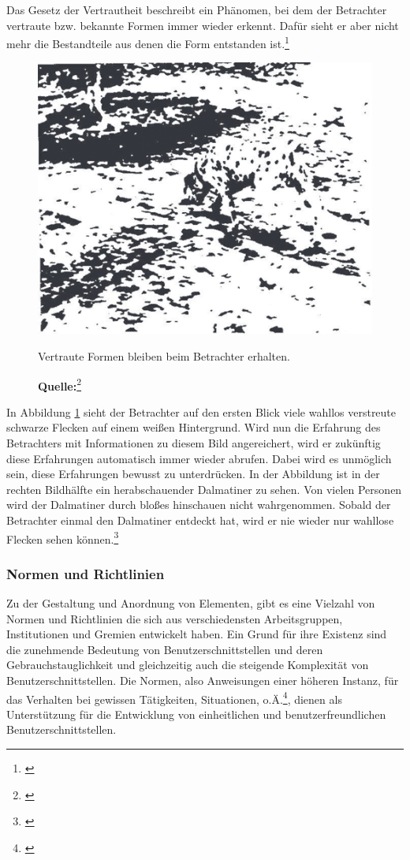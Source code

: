 Das Gesetz der Vertrautheit beschreibt ein Phänomen, bei dem der Betrachter vertraute bzw. bekannte Formen immer wieder erkennt. Dafür sieht er aber nicht mehr die Bestandteile aus denen die Form entstanden ist.\footnote{\cite[vgl.][63f]{Dahm2006}}
\begin{figure}[H]
  \centering
  \includegraphics[scale=0.7]{img/gesetz_der_Vertrautheit.PNG}
  \caption{Vertraute Formen bleiben beim Betrachter erhalten.}
  \caption*{\textbf{Quelle:}\footnote{\cite{Dahm2006}}}
  \label{fig:vertrautheit}
\end{figure}
In Abbildung \ref{fig:vertrautheit} sieht der Betrachter auf den ersten Blick viele wahllos verstreute schwarze Flecken auf einem weißen Hintergrund. Wird nun die Erfahrung des Betrachters mit Informationen zu diesem Bild angereichert, wird er zukünftig diese Erfahrungen automatisch immer wieder abrufen. Dabei wird es unmöglich sein, diese Erfahrungen bewusst zu unterdrücken. In der Abbildung ist in der rechten Bildhälfte ein herabschauender Dalmatiner zu sehen. Von vielen Personen wird der Dalmatiner durch bloßes hinschauen nicht wahrgenommen. Sobald der Betrachter einmal den Dalmatiner entdeckt hat, wird er nie wieder nur wahllose Flecken sehen können.\footnote{\cite[vgl.][63f]{Dahm2006}}


\subsubsection{Normen und Richtlinien}
\label{sec:normenUndRichtlinien}
Zu der Gestaltung und Anordnung von Elementen, gibt es eine Vielzahl von Normen und Richtlinien die sich aus verschiedensten Arbeitsgruppen, Institutionen und Gremien entwickelt haben. Ein Grund für ihre Existenz sind die zunehmende Bedeutung von Benutzerschnittstellen und deren Gebrauchstauglichkeit und gleichzeitig auch die steigende Komplexität von Benutzerschnittstellen. Die Normen, also Anweisungen einer höheren Instanz, für das Verhalten bei gewissen Tätigkeiten, Situationen, o.Ä.\footnote{\cite[vgl.][]{duden}}, dienen als Unterstützung für die Entwicklung von einheitlichen und benutzerfreundlichen Benutzerschnittstellen. 

